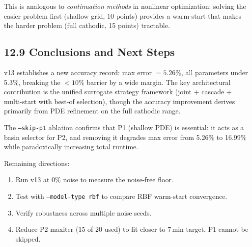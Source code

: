 \documentclass[11pt]{article}
\begin{document}
This is analogous to \textit{continuation methods} in nonlinear optimization:
solving the easier problem first (shallow grid, 10 points) provides a
warm-start that makes the harder problem (full cathodic, 15 points) tractable.

\subsection*{12.9 Conclusions and Next Steps}

v13 establishes a new accuracy record: max error $= 5.26\%$, all parameters
under 5.3\%, breaking the $<10\%$ barrier by a wide margin.  The key
architectural contribution is the unified surrogate strategy framework
(joint + cascade + multi-start with best-of selection), though the accuracy
improvement derives primarily from PDE refinement on the full cathodic range.

The \texttt{--skip-p1} ablation confirms that P1 (shallow PDE) is essential:
it acts as a basin selector for P2, and removing it degrades max error from
5.26\% to 16.99\% while paradoxically increasing total runtime.

Remaining directions:
\begin{enumerate}
  \item Run v13 at $0\%$ noise to measure the noise-free floor.
  \item Test with \texttt{--model-type rbf} to compare RBF warm-start convergence.
  \item Verify robustness across multiple noise seeds.
  \item Reduce P2 maxiter (15 of 20 used) to fit closer to 7\,min target.
        P1 cannot be skipped.
\end{enumerate}
\end{document}
